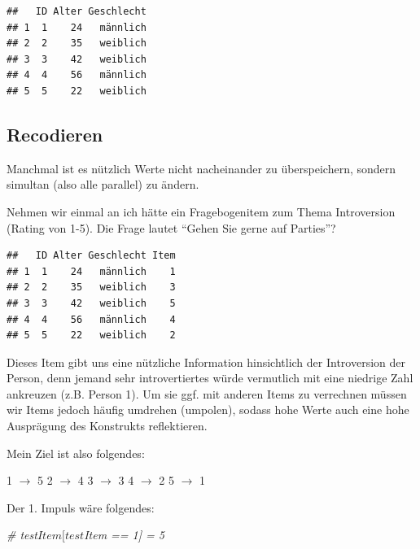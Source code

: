 \documentclass[
]{book}
\newenvironment{Shaded}{\begin{snugshade}}{\end{snugshade}}
\newcommand{\CommentTok}[1]{\textcolor[rgb]{0.56,0.35,0.01}{\textit{#1}}}
\newcommand{\DecValTok}[1]{\textcolor[rgb]{0.00,0.00,0.81}{#1}}
\newcommand{\FunctionTok}[1]{\textcolor[rgb]{0.00,0.00,0.00}{#1}}
\newcommand{\NormalTok}[1]{#1}
\newcommand{\OtherTok}[1]{\textcolor[rgb]{0.56,0.35,0.01}{#1}}
\newcommand{\SpecialCharTok}[1]{\textcolor[rgb]{0.00,0.00,0.00}{#1}}
\begin{document}
\begin{verbatim}
##   ID Alter Geschlecht
## 1  1    24   männlich
## 2  2    35   weiblich
## 3  3    42   weiblich
## 4  4    56   männlich
## 5  5    22   weiblich
\end{verbatim}

\hypertarget{recodieren}{%
\subsection{Recodieren}\label{recodieren}}

Manchmal ist es nützlich Werte nicht nacheinander zu überspeichern, sondern simultan (also alle parallel) zu ändern.

Nehmen wir einmal an ich hätte ein Fragebogenitem zum Thema Introversion (Rating von 1-5). Die Frage lautet ``Gehen Sie gerne auf Parties''?

\begin{Shaded}
\end{Shaded}

\begin{verbatim}
##   ID Alter Geschlecht Item
## 1  1    24   männlich    1
## 2  2    35   weiblich    3
## 3  3    42   weiblich    5
## 4  4    56   männlich    4
## 5  5    22   weiblich    2
\end{verbatim}

Dieses Item gibt uns eine nützliche Information hinsichtlich der Introversion der Person, denn jemand sehr introvertiertes würde vermutlich mit eine niedrige Zahl ankreuzen (z.B. Person 1). Um sie ggf. mit anderen Items zu verrechnen müssen wir Items jedoch häufig umdrehen (umpolen), sodass hohe Werte auch eine hohe Ausprägung des Konstrukts reflektieren.

Mein Ziel ist also folgendes:

1 \(\rightarrow\) 5
2 \(\rightarrow\) 4
3 \(\rightarrow\) 3
4 \(\rightarrow\) 2
5 \(\rightarrow\) 1

Der 1. Impuls wäre folgendes:

\begin{Shaded}
\begin{Highlighting}[]
\CommentTok{\# test$Item[test$Item == 1] = 5}
\end{Highlighting}
\end{Shaded}
\end{document}
